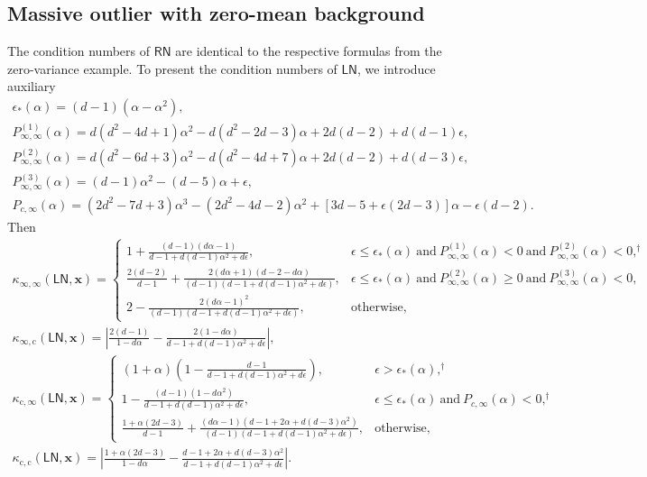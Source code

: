 \documentclass[namedate,webpdf,imanum]{ima-authoring-template}
\newcommand{\Matrix}[1]{\mathbf{#1}}
\newcommand{\Layer}[1]{\mathsf{#1}}
\newcommand{\cond}[3][]{\kappa_{\mathrm{#2}} #1( #3 #1)}
\numberwithin{equation}{section}
\begin{document}
\subsection{Massive outlier with zero-mean background}
The condition numbers of $\Layer{RN}$ are identical to the respective formulas from the zero-variance example.
To present the condition numbers of $\Layer{LN}$, we introduce auxiliary
\begin{gather*}
    \epsilon_\ast(\alpha) = (d-1) (\alpha - \alpha^2), \\
    P_{\infty,\infty}^{(1)}(\alpha) = d(d^2 - 4d + 1)\alpha^2 - d(d^2 - 2d - 3)\alpha + 2d(d-2) + d(d-1)\epsilon, \\
    P_{\infty,\infty}^{(2)}(\alpha) = d(d^2 - 6d + 3)\alpha^2 - d(d^2 - 4d + 7)\alpha + 2d(d-2) + d(d-3)\epsilon, \\
    P_{\infty,\infty}^{(3)}(\alpha) = (d-1)\alpha^2 - (d-5)\alpha + \epsilon, \\
    P_{c,\infty}(\alpha) = (2d^2 - 7d + 3)\alpha^3 - (2d^2 - 4d - 2)\alpha^2 + [3d - 5 + \epsilon(2d-3)]\alpha - \epsilon(d-2).
\end{gather*}
Then
\begin{gather*}
    \cond{\infty,\infty}{\Layer{LN}, \Matrix{x}} = \begin{cases}
        1 + \frac{(d-1) (d\alpha-1)}{d-1 + d(d-1)\alpha^2 + d\epsilon}, & \epsilon \leq \epsilon_\ast(\alpha)~\text{and}~P_{\infty,\infty}^{(1)}(\alpha) < 0~\text{and}~P_{\infty,\infty}^{(2)}(\alpha) < 0,^\dagger \\
        \frac{2(d-2)}{d-1} + \frac{2(d\alpha + 1)(d - 2 -d\alpha)}{(d-1) (d-1 + d(d-1)\alpha^2 + d\epsilon)}, & \epsilon \leq \epsilon_\ast(\alpha)~\text{and}~P_{\infty,\infty}^{(2)}(\alpha) \geq 0~\text{and}~P_{\infty,\infty}^{(3)}(\alpha) < 0, \\
        2 - \frac{2(d\alpha - 1)^2}{(d-1) (d-1 + d(d-1)\alpha^2 + d\epsilon)}, & \text{otherwise},
    \end{cases}\\
    \cond{\infty,c}{\Layer{LN}, \Matrix{x}} = 
        \left| \frac{2(d-1)}{1-d\alpha} - \frac{2(1-d\alpha)}{d-1 + d(d-1)\alpha^2 + d\epsilon} \right|, \\
    \cond{c,\infty}{\Layer{LN}, \Matrix{x}} = \begin{cases}
        (1 + \alpha) \left( 1 - \frac{d-1}{d-1 + d(d-1)\alpha^2 + d\epsilon} \right), & \epsilon > \epsilon_\ast(\alpha),^\dagger \\
        1 - \frac{(d-1)(1 - d\alpha^2)}{d-1 + d(d-1)\alpha^2 + d\epsilon}, & \epsilon \leq \epsilon_\ast(\alpha)~\text{and}~P_{c,\infty}(\alpha) < 0,^\dagger \\
        \frac{1 + \alpha(2d-3)}{d-1} + \frac{(d\alpha-1)(d-1 + 2\alpha + d(d-3)\alpha^2)}{(d-1)(d-1 + d(d-1)\alpha^2 + d\epsilon)}, & \text{otherwise},
    \end{cases}\\
    \cond{c,c}{\Layer{LN}, \Matrix{x}} = \left| \frac{1 + \alpha(2d-3)}{1 - d\alpha} - \frac{d-1 + 2\alpha + d(d-3)\alpha^2}{d-1 + d(d-1)\alpha^2 + d\epsilon} \right|.
\end{gather*}
\end{document}
